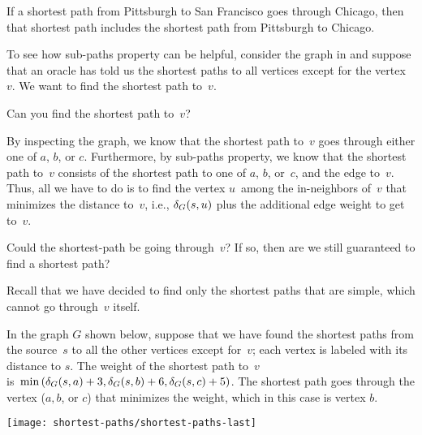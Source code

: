 \begin{example}
If a shortest path from Pittsburgh to San Francisco goes through
Chicago, then that shortest path includes the shortest path from
Pittsburgh to Chicago.   
\end{example}


To see how sub-paths property can be helpful, consider the graph in
 and suppose that an oracle has told us
the shortest paths to all vertices except for the vertex~$v$.  We want
to find the shortest path to~$v$.
%
\begin{question}
Can you find the shortest path to~$v$?
\end{question}
%
By inspecting the graph, we know that the shortest path to~$v$ goes
through either one of $a$, $b$, or $c$. Furthermore, by sub-paths
property, we know that the shortest path to~$v$ consists of the
shortest path to one of $a$, $b$, or~$c$, and the edge to~$v$.  Thus,
all we have to do is to find the vertex $u$~among the in-neighbors
of~$v$ that minimizes the distance to~$v$, i.e., $\delta_G(s,u)$ plus
the additional edge weight to get to~$v$.
%
\begin{question}
Could the shortest-path be going through~$v$?  If so, then are we
still guaranteed to find a shortest path?
\end{question}
%
Recall that we have decided to find only the shortest paths that are
simple, which cannot go through~$v$ itself.


\begin{example}
  In the graph $G$ shown below, suppose that we have found the
  shortest paths from the source~$s$ to all the other vertices except
  for~$v$; each vertex is labeled with its distance to $s$. The weight
  of the shortest path to~$v$ 
%
\\ 
%
is~$\min{
\left(
\dist_G(s,a) + 3,
%
\dist_G(s,b) + 6,
%
\dist_G(s,c)+5
\right)
}$.
%
The shortest path goes through the vertex
  ($a,b$, or $c$) that minimizes the weight, which in this case is
  vertex $b$. 

\begin{center}
\texttt{[image: shortest-paths/shortest-paths-last]}
\end{center}
\label{ex:shortestpath::allbutone}
\end{example}


